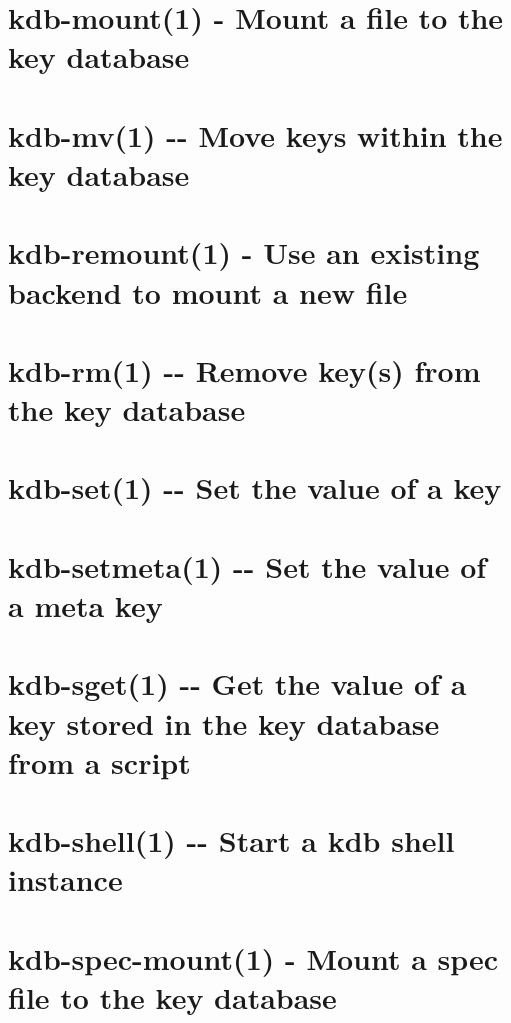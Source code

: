 \documentclass[twoside]{book}
\newcommand{\+}{\discretionary{\mbox{\scriptsize$\hookleftarrow$}}{}{}}
\begin{document}
\chapter{kdb-\/mount(1) -\/ Mount a file to the key database}
\label{md_doc_help_kdb-mount}
\hypertarget{md_doc_help_kdb-mount}{}

\chapter{kdb-\/mv(1) -\/-\/ Move keys within the key database}
\label{md_doc_help_kdb-mv}
\hypertarget{md_doc_help_kdb-mv}{}

\chapter{kdb-\/remount(1) -\/ Use an existing backend to mount a new file}
\label{md_doc_help_kdb-remount}
\hypertarget{md_doc_help_kdb-remount}{}

\chapter{kdb-\/rm(1) -\/-\/ Remove key(s) from the key database}
\label{md_doc_help_kdb-rm}
\hypertarget{md_doc_help_kdb-rm}{}

\chapter{kdb-\/set(1) -\/-\/ Set the value of a key}
\label{md_doc_help_kdb-set}
\hypertarget{md_doc_help_kdb-set}{}

\chapter{kdb-\/setmeta(1) -\/-\/ Set the value of a meta key}
\label{md_doc_help_kdb-setmeta}
\hypertarget{md_doc_help_kdb-setmeta}{}

\chapter{kdb-\/sget(1) -\/-\/ Get the value of a key stored in the key database from a script}
\label{md_doc_help_kdb-sget}
\hypertarget{md_doc_help_kdb-sget}{}

\chapter{kdb-\/shell(1) -\/-\/ Start a kdb shell instance}
\label{md_doc_help_kdb-shell}
\hypertarget{md_doc_help_kdb-shell}{}

\chapter{kdb-\/spec-\/mount(1) -\/ Mount a spec file to the key database}
\label{md_doc_help_kdb-spec-mount}
\hypertarget{md_doc_help_kdb-spec-mount}{}

\end{document}
